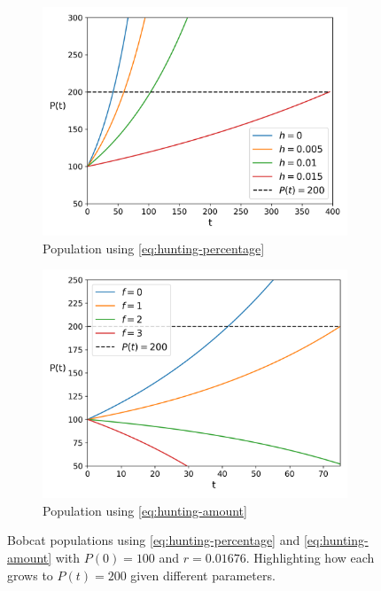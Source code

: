 \documentclass{article}
\begin{document}
\begin{figure}[h]
    \centering
    \begin{subfigure}{.5\textwidth}
        \centering
        \includegraphics[width=.95\linewidth]{./hunting_strategy/percentage_growth.png}
        \caption{Population using \cref{eq:hunting-percentage}}
        \label{fig:hunting-strategy-percentage-growth}
    \end{subfigure}%
    \begin{subfigure}{.5\textwidth}
        \centering
        \includegraphics[width=.95\linewidth]{./hunting_strategy/amount_growth.png}
        \caption{Population using \cref{eq:hunting-amount}}
        \label{fig:hunting-strategy-amount-growth}
    \end{subfigure}
    \caption{Bobcat populations using \cref{eq:hunting-percentage} and \cref{eq:hunting-amount} with $P(0) = 100$ and $r = 0.01676$. Highlighting how each grows to $P(t)=200$ given different parameters.}
    \label{fig:4}
\end{figure}
\end{document}
